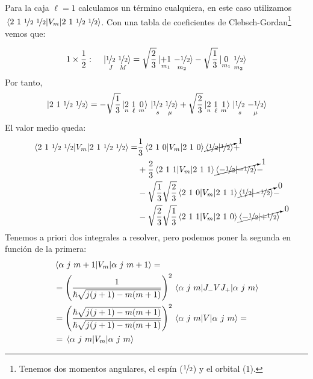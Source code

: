 Para la caja $\ell=1$ calculamos un
término cualquiera, en este caso utilizamos $\ev{V_m}{2\ 1\ \nicefrac{1}{2}\
  \nicefrac{1}{2}}$. Con una tabla de coeficientes de
Clebsch-Gordan\footnote{Tenemos dos momentos angulares, el espín
  ($\nicefrac{1}{2}$) y el orbital ($1$).}
vemos que:

\begin{equation}
  1 \times \frac{1}{2}:\ \ \ \ket*{\underset{J}{\oh}\
    \underset{M}{\oh}}  = \sqrt{\frac{2}{3}} \ket*{\underset{m_1}{+1}\
    \underset{m_2}{-\oh}} -\sqrt{\frac{1}{3}} \ket*{\underset{m_1}{0}\ \underset{m_2}{\oh}}
\end{equation}
Por tanto,
\begin{equation}
  \ket*{2\  1\  {\nicefrac{1}{2}}\   {\nicefrac{1}{2}}} = -\sqrt{\frac{1}{3}} \ket*{\underset{n}{2}\
  \underset{\ell}{1}\ \underset{m}{0}}\ket*{\underset{s}{{\nicefrac{1}{2}}}\
  \underset{\mu}{{\nicefrac{1}{2}}}}+\sqrt{\frac{2}{3}} \ket*{\underset{n}{2}\
  \underset{\ell}{1}\ \underset{m}{1}}\ket*{\underset{s}{{\nicefrac{1}{2}}}\
  \underset{\mu}{-{\nicefrac{1}{2}}}}
\end{equation}
El valor medio queda:
\begin{equation}
  \begin{split}
    \ev{V_m}{2\ 1\ \nicefrac{1}{2}\ \nicefrac{1}{2}} =& \frac{1}{3}
    \ev{V_m}{2 \ 1\ 0}\cancelto{1}{\braket{\oh}{\oh}} + \\ &+ \frac{2}{3}
    \ev{V_m}{2 \ 1\ 1}\cancelto{1}{\braket{-\oh}{-\oh}} - \\ &-
    \sqrt{\frac{1}{3}}\sqrt{\frac{2}{3}} \matrixel{2\ 1\ 0}{V_m}{2\ 1\
    1} \cancelto{0}{\braket{\oh}{-\oh}} - \\ &-
    \sqrt{\frac{2}{3}}\sqrt{\frac{1}{3}} \matrixel{2\ 1\ 1}{V_m}{2\ 1\
    0} \cancelto{0}{\braket{-\oh}{+\oh}}
  \end{split}
\end{equation}
Tenemos a priori dos integrales a resolver, pero podemos poner la
segunda en función de la primera: 
\begin{equation}
  \begin{split}
    &\ev{V_m}{\alpha\ j\ m+1} = 
\\ &=\left(
      \frac{1}{\hbar\sqrt{j(j+1)-m(m+1)}} \right)^2
    \ev{J_-VJ_+}{\alpha \ j \ m}
\\ &=\left(
      \frac{\hbar\sqrt{j(j+1)-m(m+1)}}{\hbar\sqrt{j(j+1)-m(m+1)}} \right)^2
    \ev{V}{\alpha \ j \ m} =
    \\ & = 
    \ev{V_m}{\alpha\ j\ m}
  \end{split}
  \label{eq:exercises_recurrence}
\end{equation}

